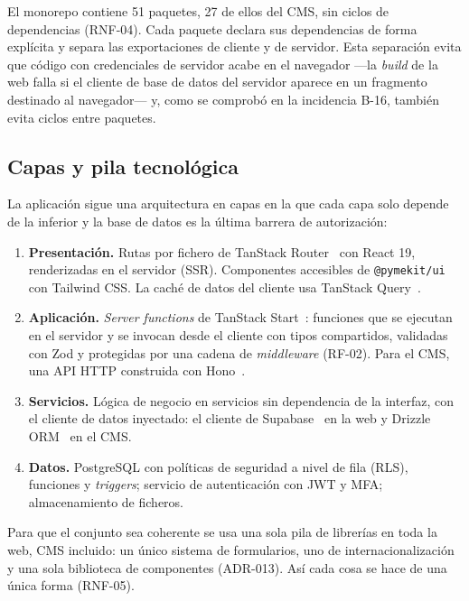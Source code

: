 El monorepo contiene 51 paquetes, 27 de ellos del CMS, sin ciclos de
dependencias (RNF-04). Cada paquete declara sus dependencias de forma
explícita y separa las exportaciones de cliente y de servidor. Esta
separación evita que código con credenciales de servidor acabe en el
navegador ---la \textit{build} de la web falla si el cliente de base de datos
del servidor aparece en un fragmento destinado al navegador--- y, como se
comprobó en la incidencia B-16, también evita ciclos entre paquetes.

\subsection{Capas y pila tecnológica}
\label{sec:dis-capas}

La aplicación sigue una arquitectura en capas en la que cada capa solo
depende de la inferior y la base de datos es la última barrera de
autorización:

\begin{enumerate}
  \item \textbf{Presentación.} Rutas por fichero de TanStack
        Router~\cite{tanstack-router} con React 19, renderizadas en el
        servidor (SSR). Componentes accesibles de \texttt{@pymekit/ui}
        con Tailwind CSS. La caché de datos del cliente usa TanStack
        Query~\cite{tanstack-query}.
  \item \textbf{Aplicación.} \textit{Server functions} de TanStack
        Start~\cite{tanstack-start}: funciones que se ejecutan en el servidor
        y se invocan desde el cliente con tipos compartidos, validadas con
        Zod y protegidas por una cadena de \textit{middleware} (RF-02). Para el
        CMS, una API HTTP construida con Hono~\cite{hono}.
  \item \textbf{Servicios.} Lógica de negocio en servicios sin dependencia de
        la interfaz, con el cliente de datos inyectado: el cliente de
        Supabase~\cite{supabase-docs} en la web y Drizzle ORM~\cite{drizzle}
        en el CMS.
  \item \textbf{Datos.} PostgreSQL con políticas de seguridad a nivel de fila
        (RLS), funciones y \textit{triggers}; servicio de autenticación con
        JWT y MFA; almacenamiento de ficheros.
\end{enumerate}

Para que el conjunto sea coherente se usa una sola pila de librerías en toda
la web, CMS incluido: un único sistema de formularios, uno de
internacionalización y una sola biblioteca de componentes (ADR-013). Así cada
cosa se hace de una única forma (RNF-05).

